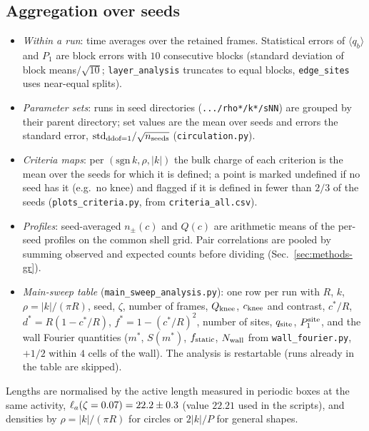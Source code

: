 \subsection{Aggregation over seeds}
\label{sec:methods-aggregate}

\begin{itemize}
  \item \emph{Within a run}: time averages over the retained frames. Statistical errors of $\langle q_b\rangle$
        and $P_1$ are block errors with $10$ consecutive blocks (standard deviation of block means$/\sqrt{10}$;
        \texttt{layer\_analysis} truncates to equal blocks, \texttt{edge\_sites} uses near-equal splits).
  \item \emph{Parameter sets}: runs in seed directories (\texttt{.../rho*/k*/sNN}) are grouped by their parent
        directory; set values are the mean over seeds and errors the standard error,
        $\mathrm{std}_{\rm ddof=1}/\sqrt{n_{\rm seeds}}$ (\texttt{circulation.py}).
  \item \emph{Criteria maps}: per $(\mathrm{sgn}\,k,\rho,|k|)$ the bulk charge of each criterion is the mean over the
        seeds for which it is defined; a point is marked undefined if no seed has it (e.g.\ no knee) and flagged if
        it is defined in fewer than $2/3$ of the seeds (\texttt{plots\_criteria.py}, from \texttt{criteria\_all.csv}).
  \item \emph{Profiles}: seed-averaged $n_\pm(c)$ and $Q(c)$ are arithmetic means of the per-seed profiles on the
        common shell grid. Pair correlations are pooled by summing observed and expected counts before dividing
        (Sec.~\ref{sec:methods-gr}).
  \item \emph{Main-sweep table} (\texttt{main\_sweep\_analysis.py}): one row per run with $R$, $k$, $\rho=|k|/(\pi R)$,
        seed, $\zeta$, number of frames, $Q_{\rm knee}$, $c_{\rm knee}$ and contrast, $c^*/R$, $d^*=R(1-c^*/R)$,
        $f^*=1-(c^*/R)^2$, number of sites, $q_{\rm site}$, $P_1^{\rm site}$, and the wall Fourier quantities
        ($m^*$, $S(m^*)$, $f_{\rm static}$, $N_{\rm wall}$ from \texttt{wall\_fourier.py}, $+1/2$ within $4$ cells of
        the wall). The analysis is restartable (runs already in the table are skipped).
\end{itemize}
Lengths are normalised by the active length measured in periodic boxes at the same activity,
$\ell_a(\zeta=0.07)=22.2\pm0.3$ (value $22.21$ used in the scripts), and densities by $\rho=|k|/(\pi R)$ for circles or
$2|k|/P$ for general shapes.
